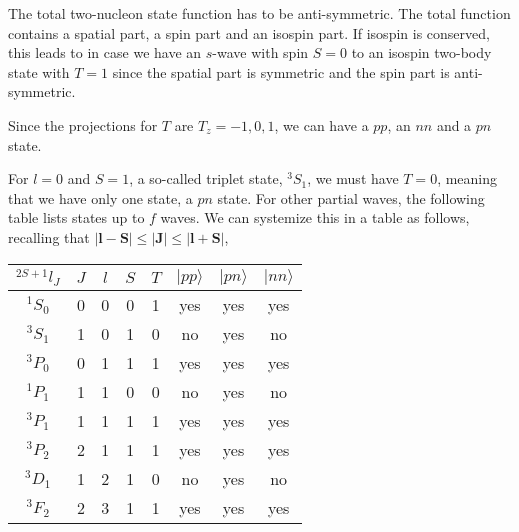 \documentclass[graybox,sectrefs,envcountresetchap,open=right]{svmonodo}
\begin{document}
The total two-nucleon state function has to be anti-symmetric. The total function contains a spatial part, a spin part and an isospin part. If isospin is conserved, this leads to in case we have an $s$-wave with spin $S=0$ to an isospin 
two-body state with $T=1$ since the spatial part is symmetric and the spin part is anti-symmetric. 

Since the projections for $T$ are $T_z=-1,0,1$, we can have a $pp$, an $nn$ and a $pn$ state.

For $l=0$ and $S=1$, a so-called triplet state, $^3S_1$, we must have $T=0$, meaning that we have only one state, a $pn$ state. For other partial waves, the following table lists states up to $f$ waves.
We can systemize this in a table as follows, recalling that $|\mathbf{l}-\mathbf{S}| \le |\mathbf{J}| \le |\mathbf{l}+\mathbf{S}|$,  



{\small   %

\vspace{4mm}

\begin{tabular}{cccccccc}
\hline
\multicolumn{1}{c}{ $^{2S+1}l_J$ } & \multicolumn{1}{c}{ $J$ } & \multicolumn{1}{c}{ $l$ } & \multicolumn{1}{c}{ $S$ } & \multicolumn{1}{c}{ $T$ } & \multicolumn{1}{c}{ $\vert pp\rangle$ } & \multicolumn{1}{c}{ $\vert pn\rangle$ } & \multicolumn{1}{c}{ $\vert nn\rangle$ } \\
\hline
$^{1}S_0$    & 0   & 0   & 0   & 1   & yes               & yes               & yes               \\
$^{3}S_1$    & 1   & 0   & 1   & 0   & no                & yes               & no                \\
$^{3}P_0$    & 0   & 1   & 1   & 1   & yes               & yes               & yes               \\
$^{1}P_1$    & 1   & 1   & 0   & 0   & no                & yes               & no                \\
$^{3}P_1$    & 1   & 1   & 1   & 1   & yes               & yes               & yes               \\
$^{3}P_2$    & 2   & 1   & 1   & 1   & yes               & yes               & yes               \\
$^{3}D_1$    & 1   & 2   & 1   & 0   & no                & yes               & no                \\
$^{3}F_2$    & 2   & 3   & 1   & 1   & yes               & yes               & yes               \\
\hline
\end{tabular}

\vspace{4mm}

}
\end{document}
